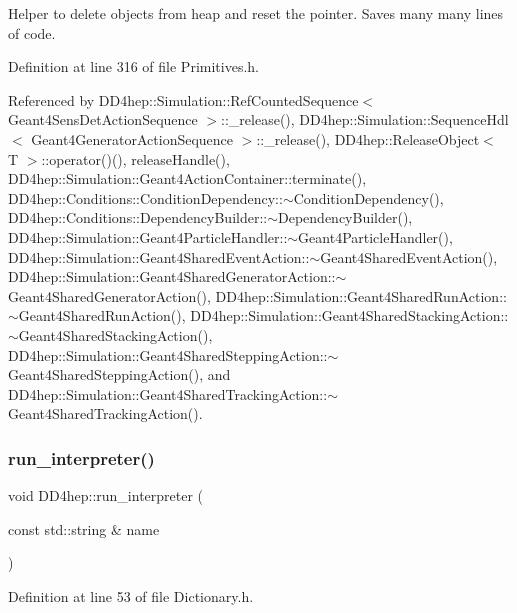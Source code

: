 Helper to delete objects from heap and reset the pointer. Saves many many lines of code. 



Definition at line 316 of file Primitives.\+h.



Referenced by D\+D4hep\+::\+Simulation\+::\+Ref\+Counted\+Sequence$<$ Geant4\+Sens\+Det\+Action\+Sequence $>$\+::\+\_\+release(), D\+D4hep\+::\+Simulation\+::\+Sequence\+Hdl$<$ Geant4\+Generator\+Action\+Sequence $>$\+::\+\_\+release(), D\+D4hep\+::\+Release\+Object$<$ T $>$\+::operator()(), release\+Handle(), D\+D4hep\+::\+Simulation\+::\+Geant4\+Action\+Container\+::terminate(), D\+D4hep\+::\+Conditions\+::\+Condition\+Dependency\+::$\sim$\+Condition\+Dependency(), D\+D4hep\+::\+Conditions\+::\+Dependency\+Builder\+::$\sim$\+Dependency\+Builder(), D\+D4hep\+::\+Simulation\+::\+Geant4\+Particle\+Handler\+::$\sim$\+Geant4\+Particle\+Handler(), D\+D4hep\+::\+Simulation\+::\+Geant4\+Shared\+Event\+Action\+::$\sim$\+Geant4\+Shared\+Event\+Action(), D\+D4hep\+::\+Simulation\+::\+Geant4\+Shared\+Generator\+Action\+::$\sim$\+Geant4\+Shared\+Generator\+Action(), D\+D4hep\+::\+Simulation\+::\+Geant4\+Shared\+Run\+Action\+::$\sim$\+Geant4\+Shared\+Run\+Action(), D\+D4hep\+::\+Simulation\+::\+Geant4\+Shared\+Stacking\+Action\+::$\sim$\+Geant4\+Shared\+Stacking\+Action(), D\+D4hep\+::\+Simulation\+::\+Geant4\+Shared\+Stepping\+Action\+::$\sim$\+Geant4\+Shared\+Stepping\+Action(), and D\+D4hep\+::\+Simulation\+::\+Geant4\+Shared\+Tracking\+Action\+::$\sim$\+Geant4\+Shared\+Tracking\+Action().

\hypertarget{namespace_d_d4hep_ab5d6e765a0aca826a176a6e221d416b4}{}\label{namespace_d_d4hep_ab5d6e765a0aca826a176a6e221d416b4} 
\subsubsection{\texorpdfstring{run\+\_\+interpreter()}{run\_interpreter()}}
{\footnotesize\ttfamily void D\+D4hep\+::run\+\_\+interpreter (\begin{DoxyParamCaption}\item[{const std\+::string \&}]{name }\end{DoxyParamCaption})}



Definition at line 53 of file Dictionary.\+h.



